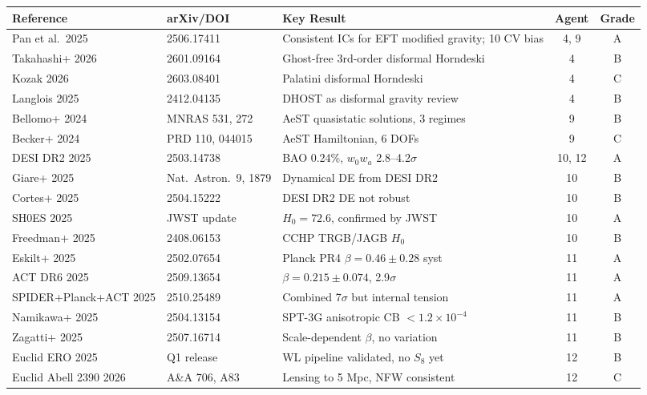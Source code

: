 \documentclass[11pt,a4paper]{article}
\begin{document}
\begin{longtable}{p{3cm}p{3cm}p{5cm}cc}
\toprule
\textbf{Reference} & \textbf{arXiv/DOI} & \textbf{Key Result} & \textbf{Agent} & \textbf{Grade} \\
\midrule
\endhead
Pan et al.\ 2025 & 2506.17411 & Consistent ICs for EFT modified gravity; 10 CV bias & 4, 9 & A \\
Takahashi+ 2026 & 2601.09164 & Ghost-free 3rd-order disformal Horndeski & 4 & B \\
Kozak 2026 & 2603.08401 & Palatini disformal Horndeski & 4 & C \\
Langlois 2025 & 2412.04135 & DHOST as disformal gravity review & 4 & B \\
Bellomo+ 2024 & MNRAS 531, 272 & AeST quasistatic solutions, 3 regimes & 9 & B \\
Becker+ 2024 & PRD 110, 044015 & AeST Hamiltonian, 6 DOFs & 9 & C \\
DESI DR2 2025 & 2503.14738 & BAO 0.24\%, $w_0w_a$ 2.8--4.2$\sigma$ & 10, 12 & A \\
Giare+ 2025 & Nat.\ Astron.\ 9, 1879 & Dynamical DE from DESI DR2 & 10 & B \\
Cortes+ 2025 & 2504.15222 & DESI DR2 DE not robust & 10 & B \\
SH0ES 2025 & JWST update & $H_0 = 72.6$, confirmed by JWST & 10 & A \\
Freedman+ 2025 & 2408.06153 & CCHP TRGB/JAGB $H_0$ & 10 & B \\
Eskilt+ 2025 & 2502.07654 & Planck PR4 $\beta = 0.46 \pm 0.28$ syst & 11 & A \\
ACT DR6 2025 & 2509.13654 & $\beta = 0.215 \pm 0.074$, 2.9$\sigma$ & 11 & A \\
SPIDER+Planck+ACT 2025 & 2510.25489 & Combined 7$\sigma$ but internal tension & 11 & A \\
Namikawa+ 2025 & 2504.13154 & SPT-3G anisotropic CB $< 1.2\times10^{-4}$ & 11 & B \\
Zagatti+ 2025 & 2507.16714 & Scale-dependent $\beta$, no variation & 11 & B \\
Euclid ERO 2025 & Q1 release & WL pipeline validated, no $S_8$ yet & 12 & B \\
Euclid Abell 2390 2026 & A\&A 706, A83 & Lensing to 5 Mpc, NFW consistent & 12 & C \\
\bottomrule
\end{longtable}
\end{document}
